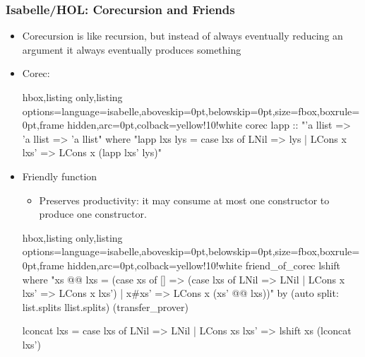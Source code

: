 \documentclass[aspectratio=169,10pt]{beamer}
\begin{document}
\begin{frame}[fragile]
  \frametitle{Isabelle/HOL: Corecursion and Friends}
  \begin{itemize}
          \item Corecursion is like recursion, but instead of always eventually reducing an argument it always eventually produces something
    \item Corec:
\begin{tcblisting}{hbox,listing only,listing options={language=isabelle,aboveskip=0pt,belowskip=0pt},size=fbox,boxrule=0pt,frame hidden,arc=0pt,colback=yellow!10!white}
corec lapp :: "'a llist => 'a llist => 'a llist" where
  "lapp lxs lys = case lxs of LNil => lys | LCons x lxs' => LCons x (lapp lxs' lys)"
\end{tcblisting}

    \item Friendly function
          \begin{itemize}
            \item Preserves productivity: it may consume at most one constructor to produce one constructor.
          \end{itemize}
\begin{tcblisting}{hbox,listing only,listing options={language=isabelle,aboveskip=0pt,belowskip=0pt},size=fbox,boxrule=0pt,frame hidden,arc=0pt,colback=yellow!10!white}
friend_of_corec lshift where
  "xs @@ lxs = (case xs of
    [] => (case lxs of LNil => LNil | LCons x lxs' => LCons x lxs')
  | x#xs' => LCons x (xs' @@ lxs))"
  by (auto split: list.splits llist.splits) (transfer_prover)

lconcat lxs = case lxs of LNil => LNil | LCons xs lxs' => lshift xs (lconcat lxs')
\end{tcblisting}
  \end{itemize}
\end{frame}
\end{document}
